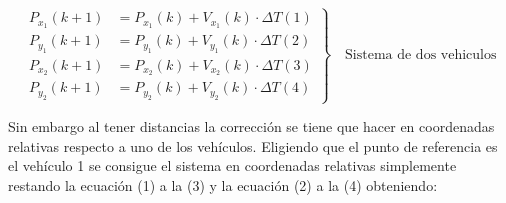\begin{equation*}
\left.
 \begin{aligned}
P_{x_1}(k+1) & = P_{x_1}(k)+V_{x_1}(k)\cdot\Delta{T} (1) \\
P_{y_1}(k+1) & = P_{y_1}(k)+V_{y_1}(k)\cdot\Delta{T} (2)\\
P_{x_2}(k+1) & = P_{x_2}(k)+V_{x_2}(k)\cdot\Delta{T} (3)\\
P_{y_2}(k+1) & = P_{y_2}(k)+V_{y_2}(k)\cdot\Delta{T} (4)
\end{aligned}
\right\}
\quad\text{Sistema de dos vehiculos}
\end{equation*}
\par
Sin embargo al tener distancias la corrección se tiene que hacer en coordenadas relativas respecto a uno de los vehículos. Eligiendo que el punto de referencia es el vehículo 1 se consigue el sistema en coordenadas relativas simplemente restando la ecuación (1) a la (3) y la ecuación (2) a la (4) obteniendo:

